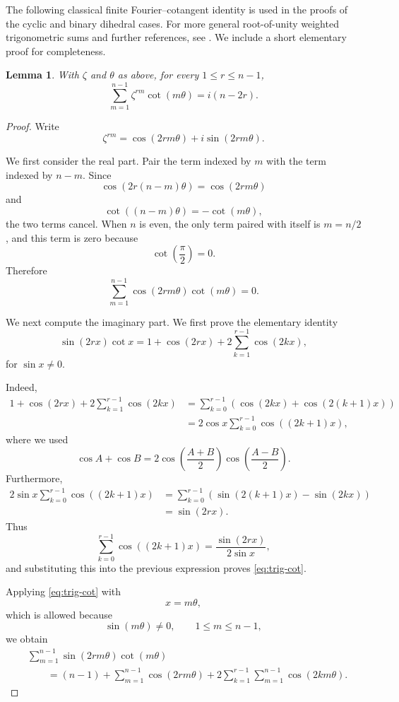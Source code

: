 \documentclass[a4paper,reqno]{amsart}
\theoremstyle{plain} %
\newtheorem{lmm}[thm]{Lemma}
\theoremstyle{definition} %
\theoremstyle{remark} %
\newcommand{\1}{\mathds{1}}   %
\begin{document}
The following classical finite Fourier–cotangent identity is used in the proofs of the cyclic and binary dihedral cases. 
For more general root-of-unity weighted trigonometric sums and further references, see \cite{LiuXin}. 
We include a short elementary proof for completeness.

\begin{lmm}\label{lem:cot-fourier}
With $\zeta$ and $\theta$ as above, for every \(1\leq r\leq n-1\),
\[
\sum_{m=1}^{n-1}
\zeta^{rm}\cot(m\theta)
=
i(n-2r).
\]
\end{lmm}

\begin{proof}
Write
\[
\zeta^{rm}
=
\cos(2rm\theta)
+i\sin(2rm\theta).
\]

We first consider the real part. Pair the term indexed by \(m\)
with the term indexed by \(n-m\). Since
\[
\cos(2r(n-m)\theta)
=
\cos(2rm\theta)
\]
and
\[
\cot((n-m)\theta)
=
-\cot(m\theta),
\]
the two terms cancel. When \(n\) is even, the only term paired
with itself is \(m=n/2\), and this term is zero because
\[
\cot\left(\frac{\pi}{2}\right)=0.
\]
Therefore
\[
\sum_{m=1}^{n-1}
\cos(2rm\theta)\cot(m\theta)
=
0.
\]

We next compute the imaginary part. We first prove the elementary
identity
\begin{equation}\label{eq:trig-cot}
\sin(2rx)\cot x
=
1+\cos(2rx)
+
2\sum_{k=1}^{r-1}\cos(2kx),
\end{equation}
for \(\sin x\neq0\).

Indeed,
\begin{align*}
1+\cos(2rx)
+2\sum_{k=1}^{r-1}\cos(2kx)
&=
\sum_{k=0}^{r-1}
\left(
\cos(2kx)+\cos(2(k+1)x)
\right)\\
&=
2\cos x
\sum_{k=0}^{r-1}\cos((2k+1)x),
\end{align*}
where we used
\[
\cos A+\cos B
=
2\cos\left(\frac{A+B}{2}\right)
\cos\left(\frac{A-B}{2}\right).
\]
Furthermore,
\begin{align*}
2\sin x
\sum_{k=0}^{r-1}\cos((2k+1)x)
&=
\sum_{k=0}^{r-1}
\left(
\sin(2(k+1)x)-\sin(2kx)
\right)\\
&=
\sin(2rx).
\end{align*}
Thus
\[
\sum_{k=0}^{r-1}\cos((2k+1)x)
=
\frac{\sin(2rx)}{2\sin x},
\]
and substituting this into the previous expression proves
\eqref{eq:trig-cot}.

Applying \eqref{eq:trig-cot} with
\[
x=m\theta,
\]
which is allowed because
\[
\sin(m\theta)\neq0,
\qquad
1\leq m\leq n-1,
\]
we obtain
\begin{align*}
&\sum_{m=1}^{n-1}
\sin(2rm\theta)\cot(m\theta)
\\
&\qquad=
(n-1)
+
\sum_{m=1}^{n-1}\cos(2rm\theta)
+
2\sum_{k=1}^{r-1}
\sum_{m=1}^{n-1}\cos(2km\theta).
\end{align*}


\end{proof}
\end{document}
